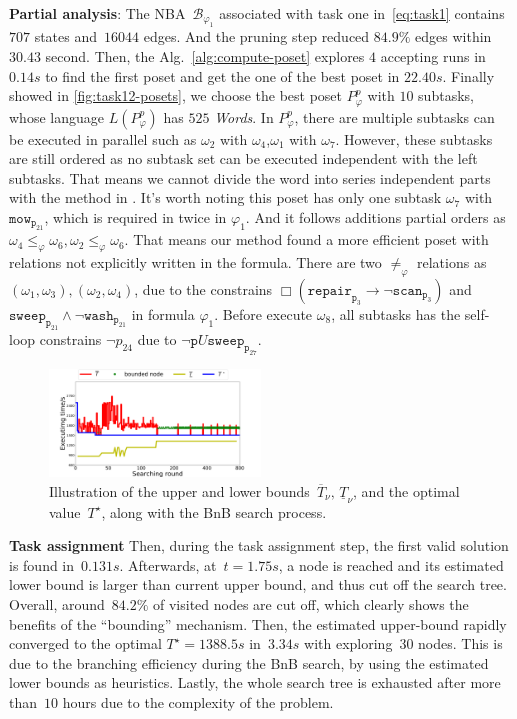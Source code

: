 \textbf{Partial analysis}:
The NBA~$\mathcal{B}_{\varphi_1}$ associated with task one in~\eqref{eq:task1}
contains~$707$ states and~$16044$ edges. And the pruning step reduced $84.9\%$ edges within 
$30.43$ second. Then, the Alg.~\ref{alg:compute-poset} explores 
 $4$ accepting runs in $0.14s$ to find the first poset and get the one of the best poset in $22.40s$.
 Finally showed in \ref{fig:task12-posets}, we choose the best poset $P^{p}_{\varphi}$ with $10$ subtasks, whose language 
 $L(P^{p}_{\varphi})$ has $525$ \emph{Words}. In $P^{p}_{\varphi}$, there are 
 multiple subtasks can be executed in parallel such as $\omega_2 $ with $ \omega_4$,$\omega_1 $ with $ \omega_7$.
 However, these subtasks are still ordered as no subtask set can be executed independent with the left 
 subtasks. That means we cannot
 divide the word into series independent parts with the method in \cite{schillinger2018simultaneous}.
 It's worth noting this poset has only one subtask $\omega_7$ with $\texttt{mow}_{\texttt{p}_{21}}$,
 which is required in twice in $\varphi_1$. And it follows additions partial orders as
 $\omega_4\leq_\varphi \omega_6,\omega_2\leq_\varphi \omega_6$. That means our method found 
 a more efficient poset with relations not explicitly written in the formula.
 There are two $\neq_\varphi$ relations as $(\omega_1,\omega_3),(\omega_2,\omega_4)$, due to the constrains 
 $\Box(\texttt{repair}_{\texttt{p}_3}\rightarrow\lnot\texttt{scan}_{\texttt{p}_3}) $ and
  $\texttt{sweep}_{\texttt{p}_{21}} \wedge \lnot \texttt{wash}_{\texttt{p}_{21}}$ in formula $\varphi_1$.
  Before execute $\omega_8$, all subtasks has the self-loop constrains $\lnot p_{24}$ due to
   $\lnot \texttt{p} U \texttt{sweep}_{\texttt{p}_{27}}$.
   

\begin{figure}[t!]
\centering%
\includegraphics[width = 0.50\textwidth]{figures/simulation/taskfinal/bnb.pdf}
\caption{Illustration of the upper and lower
bounds~$\overline{T}_\nu,\,\underline{T}_\nu$, and the optimal value~$T^\star$,
along with the BnB search process.}
\label{fig:task2-bnb}
\end{figure}
\textbf{Task assignment}
Then, during the task assignment step,
the first valid solution is found in~$0.131s$.
Afterwards, at~$t=1.75s$, a node is reached and its estimated lower
bound is larger than current upper bound, and thus cut off the search tree.
Overall, around~$84.2\%$ of visited nodes are cut off,
which clearly shows the benefits of the ``bounding'' mechanism.
Then, the estimated upper-bound rapidly converged
to the optimal $T^\star=1388.5s$ in~$3.34s$ with exploring~$30$ nodes.
This is due to the branching efficiency during the BnB search,
by using the estimated lower bounds as heuristics.
Lastly, the whole search tree is exhausted after more than~$10$ hours
due to the complexity of the problem. 


